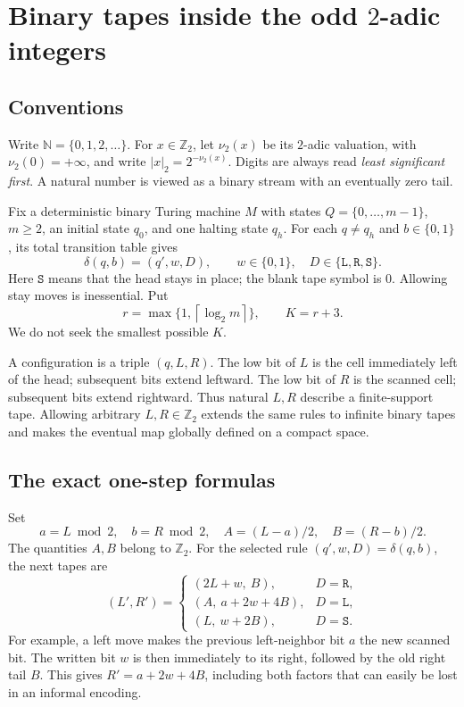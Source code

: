 \documentclass[11pt,letterpaper]{article}
\numberwithin{equation}{section}
\theoremstyle{definition}
\theoremstyle{remark}
\newcommand{\N}{\mathbb N}
\newcommand{\Bit}{\{0,1\}}
\newcommand{\ceil}[1]{\left\lceil #1\right\rceil}
\newcommand{\srcmark}[1]{\par\noindent{\small\itshape [source~#1]}\par}
\newcommand{\Ztwo}{\mathbb Z_2}
\newcommand{\nuu}{\nu_2}
\newcommand{\blank}{\mathtt{S}}
\newcommand{\moveL}{\mathtt{L}}
\newcommand{\moveR}{\mathtt{R}}
\begin{document}
\section{Binary tapes inside the odd \texorpdfstring{$2$}{2}-adic integers}\label{pqc:ad:sec:machine}
\srcmark{12}

\subsection{Conventions}
Write $\N=\{0,1,2,\ldots\}$. For $x\in\Ztwo$, let $\nuu(x)$ be its
$2$-adic valuation, with $\nuu(0)=+\infty$, and write
$|x|_2=2^{-\nuu(x)}$. Digits are always read \emph{least significant first}.
A natural number is viewed as a binary stream with an eventually zero tail.

Fix a deterministic binary Turing machine $M$ with states
$Q=\{0,\ldots,m-1\}$, $m\ge2$, an initial state $q_0$, and one halting state
$q_h$. For each $q\ne q_h$ and $b\in\Bit$, its total transition table gives
\[
\delta(q,b)=(q',w,D),\qquad w\in\Bit,\quad
D\in\{\moveL,\moveR,\blank\}.
\]
Here $\blank$ means that the head stays in place; the blank tape symbol is
$0$. Allowing stay moves is inessential. Put
\begin{equation}\label{pqc:ad:eq:rK}
r=\max\{1,\ceil{\log_2m}\},\qquad K=r+3.
\end{equation}
We do not seek the smallest possible $K$.

A configuration is a triple $(q,L,R)$. The low bit of $L$ is the cell
immediately left of the head; subsequent bits extend leftward. The low bit
of $R$ is the scanned cell; subsequent bits extend rightward. Thus natural
$L,R$ describe a finite-support tape. Allowing arbitrary $L,R\in\Ztwo$
extends the same rules to infinite binary tapes and makes the eventual
map globally defined on a compact space.

\subsection{The exact one-step formulas}
Set
\begin{equation}\label{pqc:ad:eq:split}
a=L\bmod2,\quad b=R\bmod2,\quad
A=(L-a)/2,\quad B=(R-b)/2.
\end{equation}
The quantities $A,B$ belong to $\Ztwo$. For the selected rule
$(q',w,D)=\delta(q,b)$, the next tapes are
\begin{equation}\label{pqc:ad:eq:tape}
(L',R')=
\begin{cases}
(2L+w,\ B),&D=\moveR,\\
(A,\ a+2w+4B),&D=\moveL,\\
(L,\ w+2B),&D=\blank.
\end{cases}
\end{equation}
For example, a left move makes the previous left-neighbor bit $a$ the new
scanned bit. The written bit $w$ is then immediately to its right, followed
by the old right tail $B$. This gives $R'=a+2w+4B$, including both factors
that can easily be lost in an informal encoding.
\end{document}
